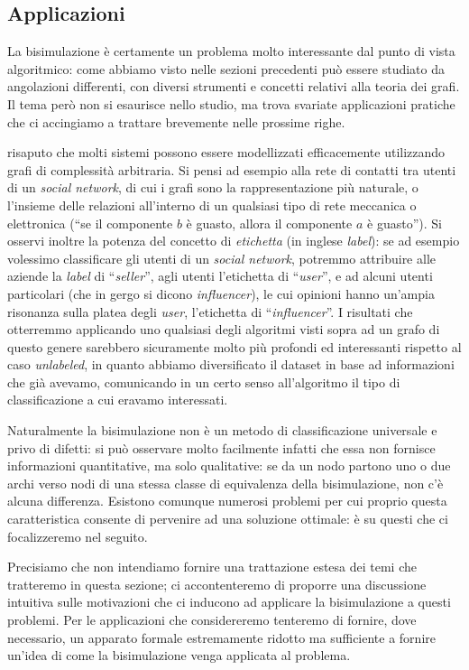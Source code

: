 \subsection{Applicazioni}
\label{sec:applications}
La bisimulazione è certamente un problema molto interessante dal punto di vista algoritmico: come abbiamo visto nelle sezioni precedenti può essere studiato da angolazioni differenti, con diversi strumenti e concetti relativi alla teoria dei grafi. Il tema però non si esaurisce nello studio, ma trova svariate applicazioni pratiche che ci accingiamo a trattare brevemente nelle prossime righe.

\accente risaputo che molti sistemi possono essere modellizzati efficacemente utilizzando grafi di complessità arbitraria. Si pensi ad esempio alla rete di contatti tra utenti di un \emph{social network}, di cui i grafi sono la rappresentazione più naturale, o l'insieme delle relazioni all'interno di un qualsiasi tipo di rete meccanica o elettronica (``se il componente $b$ è guasto, allora il componente $a$ è guasto''). Si osservi inoltre la potenza del concetto di \emph{etichetta} (in inglese \emph{label}): se ad esempio volessimo classificare gli utenti di un \emph{social network}, potremmo attribuire alle aziende la \emph{label} di ``\emph{seller}'', agli utenti l'etichetta di ``\emph{user}'', e ad alcuni utenti particolari (che in gergo si dicono \emph{influencer}), le cui opinioni hanno un'ampia risonanza sulla platea degli \emph{user}, l'etichetta di ``\emph{influencer}''. I risultati che otterremmo applicando uno qualsiasi degli algoritmi visti sopra ad un grafo di questo genere sarebbero sicuramente molto più profondi ed interessanti rispetto al caso \emph{unlabeled}, in quanto abbiamo diversificato il dataset in base ad informazioni che già avevamo, comunicando in un certo senso all'algoritmo il tipo di classificazione a cui eravamo interessati.

Naturalmente la bisimulazione non è un metodo di classificazione universale e privo di difetti: si può osservare molto facilmente infatti che essa non fornisce informazioni quantitative, ma solo qualitative: se da un nodo partono uno o due archi verso nodi di una stessa classe di equivalenza della bisimulazione, non c'è alcuna differenza. Esistono comunque numerosi problemi per cui proprio questa caratteristica consente di pervenire ad una soluzione ottimale: è su questi che ci focalizzeremo nel seguito.

Precisiamo che non intendiamo fornire una trattazione estesa dei temi che tratteremo in questa sezione; ci accontenteremo di proporre una discussione intuitiva sulle motivazioni che ci inducono ad applicare la bisimulazione a questi problemi. Per le applicazioni che considereremo tenteremo di fornire, dove necessario, un apparato formale estremamente ridotto ma sufficiente a fornire un'idea di come  la bisimulazione venga applicata al problema.

